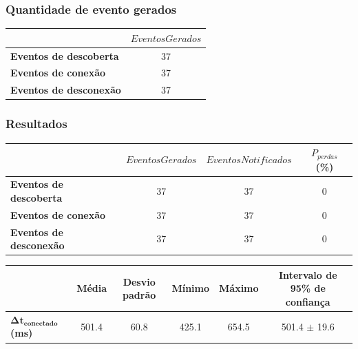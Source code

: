 \documentclass[aspectratio=169]{beamer}
\begin{document}
\begin{frame}
	\frametitle{Quantidade de evento gerados}
	\begin{table}[htb]
		\begin{center}
			\begin{tabular}{lc}
				\toprule
							       & $EventosGerados$ \\
				\midrule 
				\textbf{Eventos de descoberta} & 37               \\
				\textbf{Eventos de conexão}    & 37               \\
				\textbf{Eventos de desconexão} & 37               \\
				\bottomrule
			\end{tabular}
		\end{center}
	\end{table}
\end{frame}

\begin{frame}
	\frametitle{Resultados}
	\begin{table}[ht]
		\centering
		\begin{tabular}{lccc}
			\toprule
						       & $EventosGerados$ & $EventosNotificados$ & $P_{perdas}$ (\%) \\
			\midrule
			\textbf{Eventos de descoberta} & 37               & 37                   & 0		     \\
			\textbf{Eventos de conexão}    & 37	          & 37                   & 0		     \\
			\textbf{Eventos de desconexão} & 37	          & 37                   & 0	             \\
			\bottomrule
		\end{tabular}
	\end{table}

	\bigskip

	\begin{table}[ht]
		\centering
		\begin{adjustbox}{max width=\textwidth}
			\begin{tabular}{lccccc}
				\toprule
							  & Média & Desvio padrão & Mínimo & Máximo & Intervalo de 95\% de confiança \\
				\midrule
				$\bm{\Delta t_{conectado}}$ \textbf{(ms)} & 501.4 & 60.8         &425.1        & 654.5       &	501.4 $\pm$ 19.6	                  \\
				\bottomrule
			\end{tabular}
		\end{adjustbox}
	\end{table}

\end{frame}
\end{document}

